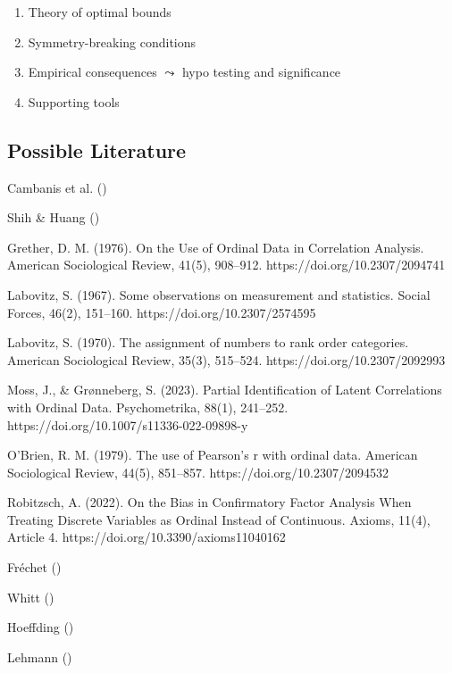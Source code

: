 \documentclass[
  12pt,
]{article}
\providecommand{\tightlist}{%
  \setlength{\itemsep}{0pt}\setlength{\parskip}{0pt}}\usepackage{longtable,booktabs,array}
\theoremstyle{plain}
\theoremstyle{definition}
\theoremstyle{remark}
\begin{document}
\begin{enumerate}
\def\labelenumi{\arabic{enumi}.}
\tightlist
\item
  Theory of optimal bounds\\
\item
  Symmetry-breaking conditions\\
\item
  Empirical consequences \(\leadsto\) hypo testing and significance
\item
  Supporting tools
\end{enumerate}

\subsection{Possible Literature}\label{possible-literature}

Cambanis et al. ()

Shih \& Huang ()

Grether, D. M. (1976). On the Use of Ordinal Data in Correlation
Analysis. American Sociological Review, 41(5), 908--912.
https://doi.org/10.2307/2094741

Labovitz, S. (1967). Some observations on measurement and statistics.
Social Forces, 46(2), 151--160. https://doi.org/10.2307/2574595

Labovitz, S. (1970). The assignment of numbers to rank order categories.
American Sociological Review, 35(3), 515--524.
https://doi.org/10.2307/2092993

Moss, J., \& Grønneberg, S. (2023). Partial Identification of Latent
Correlations with Ordinal Data. Psychometrika, 88(1), 241--252.
https://doi.org/10.1007/s11336-022-09898-y

O'Brien, R. M. (1979). The use of Pearson's r with ordinal data.
American Sociological Review, 44(5), 851--857.
https://doi.org/10.2307/2094532

Robitzsch, A. (2022). On the Bias in Confirmatory Factor Analysis When
Treating Discrete Variables as Ordinal Instead of Continuous. Axioms,
11(4), Article 4. https://doi.org/10.3390/axioms11040162

Fréchet ()

Whitt ()

Hoeffding ()

Lehmann ()
\end{document}
